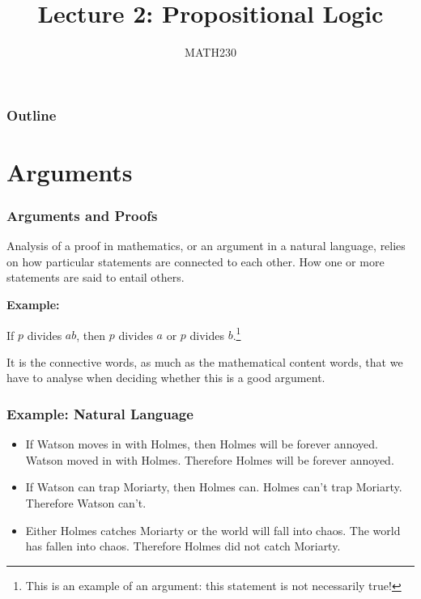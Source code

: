 \documentclass{beamer}
\title{Lecture 2: Propositional Logic}
\author{MATH230}
\institute{Te Kura P\=angarau $\vert$ School of Mathematics and Statistics \\ Te Whare W\=ananga o Waitaha $\vert$ University of Canterbury}
\date{}
\theoremstyle{indentDefn} \newtheorem{defn}[]{Definition}
\begin{document}
\begin{frame}

  \titlepage

\end{frame}

\begin{frame}
  \frametitle{Outline}

  \tableofcontents

\end{frame}



\section{Arguments}

\begin{frame}
  \frametitle{Arguments and Proofs}

Analysis of a proof in mathematics, or an argument in a natural language, relies on how particular statements are connected to each other. How one or more statements are said to entail others. 

\vspace{1cm}

 {\bf Example: }
 
 If $p$ divides $ab$, then $p$ divides $a$ or $p$ divides $b$.\footnote{This is an example of an argument: this statement is not necessarily true!}
  
 \vspace{1cm}
 
 It is the connective words, as much as the mathematical content words, that we have to analyse when deciding whether this is a good argument.



\end{frame}

\begin{frame}
	\frametitle{Example: Natural Language}
	
	\begin{itemize}
		\item If Watson moves in with Holmes, then Holmes will be forever annoyed. Watson moved in with Holmes. Therefore Holmes will be forever annoyed.
		\vspace{1cm}
		\item If Watson can trap Moriarty, then Holmes can. Holmes can't trap Moriarty. Therefore Watson can't.
		\vspace{1cm}
		\item Either Holmes catches Moriarty or the world will fall into chaos. The world has fallen into chaos. Therefore Holmes did not catch Moriarty.
		
	\end{itemize}
	
	
\end{frame}
\end{document}
